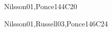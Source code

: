 \begin{syllabus}
\begin{unit}{\ISBasicSearchStrategies}{}{Nilsson01,Ponce14}{4}{C20}
\begin{topics}
    \item \ISBasicSearchStrategiesTopicProblemSpaces
    \item \ISBasicSearchStrategiesTopicFactored
    \item \ISBasicSearchStrategiesTopicUninformed
    \item \ISBasicSearchStrategiesTopicHeuristics
    \item \ISBasicSearchStrategiesTopicSpace
    \item \ISBasicSearchStrategiesTopicTwo
    \item \ISBasicSearchStrategiesTopicConstraint
\end{topics}
\begin{learningoutcomes}
    \item \ISBasicSearchStrategiesLOFormulate [\Usage]
    \item \ISBasicSearchStrategiesLODescribeTheHeuristics [\Usage]
    \item \ISBasicSearchStrategiesLODescribeTheCombinatorial [\Usage]
    \item \ISBasicSearchStrategiesLOSelectAndAppropriate [\Usage]
    \item \ISBasicSearchStrategiesLOSelectAndAppropriateAlgorithm [\Usage]
    \item \ISBasicSearchStrategiesLOEvaluateWhether [\Usage]
    \item \ISBasicSearchStrategiesLOFormulateA [\Usage]
    \item \ISBasicSearchStrategiesLOCompareAndSearch [\Usage]
\end{learningoutcomes}
\end{unit}

\begin{unit}{\ISBasicKnowledgeRepresentationandReasoning}{}{Nilsson01,Russell03,Ponce14}{6}{C24}
\begin{topics}
    \item \ISBasicKnowledgeRepresentationandReasoningTopicReview
    \item \ISBasicKnowledgeRepresentationandReasoningTopicResolution
    \item \ISBasicKnowledgeRepresentationandReasoningTopicForward
    \item \ISBasicKnowledgeRepresentationandReasoningTopicReviewOf
\end{topics}
\begin{learningoutcomes}
    \item \ISBasicKnowledgeRepresentationandReasoningLOTranslate [\Usage]
    \item \ISBasicKnowledgeRepresentationandReasoningLOConvertA [\Usage]
    \item \ISBasicKnowledgeRepresentationandReasoningLOApplyResolution [\Usage]
    \item \ISBasicKnowledgeRepresentationandReasoningLOMake [\Usage]
\end{learningoutcomes}
\end{unit}


\end{syllabus}
